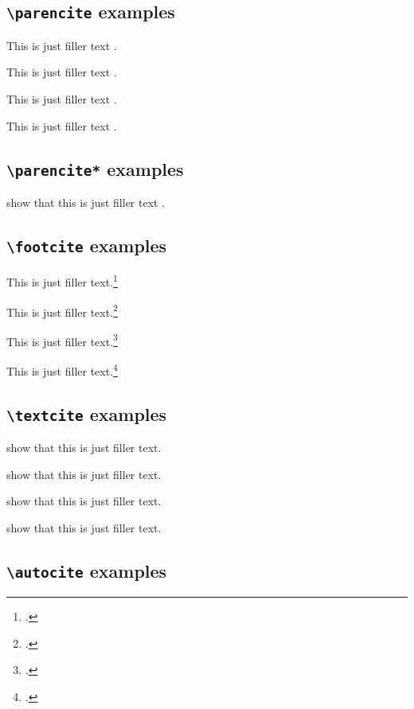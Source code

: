 \documentclass[a4paper]{article}
\newcommand{\cmd}[1]{\texttt{\textbackslash #1}}
\begin{document}
\cite[see][]{companion}

\cite[see][59--63]{companion}

\subsection*{\cmd{parencite} examples}

This is just filler text \parencite{companion}.

This is just filler text \parencite[59]{companion}.

This is just filler text \parencite[see][]{companion}.

This is just filler text \parencite[see][59--63]{companion}.

\subsection*{\cmd{parencite*} examples}

\citeauthor{companion} show that this is just filler
text \parencite*{companion}.

\subsection*{\cmd{footcite} examples}


This is just filler text.\footcite{companion}

This is just filler text.\footcite[59]{companion}

This is just filler text.\footcite[See][]{companion}

This is just filler text.\footcite[See][59--63]{companion}

\subsection*{\cmd{textcite} examples}

\textcite{companion} show that this is just filler text.

\textcite[59]{companion} show that this is just filler text.

\textcite[see][]{companion} show that this is just filler text.

\textcite[see][59--63]{companion} show that this is just filler text.

\subsection*{\cmd{autocite} examples}
\end{document}
